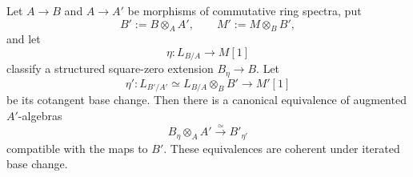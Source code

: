 \begin{proposition}
\label{prop:structured-square-zero-base-change}
Let \(A\to B\) and \(A\to A'\) be morphisms of commutative ring spectra, put
\[
    B':=B\otimes_AA',
    \qquad
    M':=M\otimes_BB',
\]
and let
\[
    \eta:L_{B/A}\longrightarrow M[1]
\]
classify a structured square-zero extension \(B_\eta\to B\). Let
\[
    \eta':L_{B'/A'}
    \simeq
    L_{B/A}\otimes_BB'
    \longrightarrow
    M'[1]
\]
be its cotangent base change. Then there is a canonical equivalence of
augmented \(A'\)-algebras
\[
    B_\eta\otimes_AA'
    \xrightarrow{\simeq}
    B'_{\eta'}
\]
compatible with the maps to \(B'\). These equivalences are coherent under
iterated base change.
\end{proposition}

